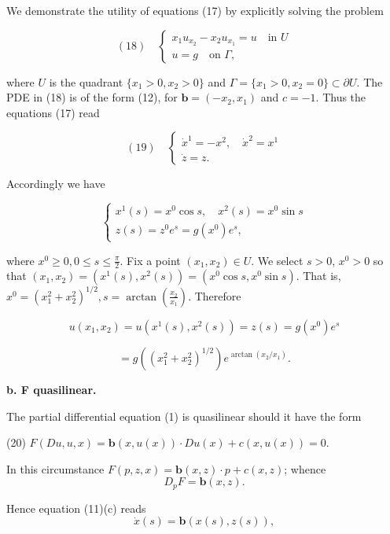 \begin{example}
\label{ex:linear-pde-quadrant-characteristics}
We demonstrate the utility of equations (17) by explicitly solving the problem

$$(18) \quad \left\{\begin{array}{l} x_1 u_{x_2} - x_2 u_{x_1} = u \quad \text{in } U \\ u = g \quad \text{on } \Gamma, \end{array}\right.$$

where $U$ is the quadrant $\{x_1 > 0, x_2 > 0\}$ and $\Gamma = \{x_1 > 0, x_2 = 0\} \subset \partial U$.
The PDE in (18) is of the form (12), for $\mathbf{b} = (-x_2, x_1)$ and $c = -1$. Thus the equations (17) read

$$(19) \quad \left\{\begin{array}{l} \dot{x}^1 = -x^2, \quad \dot{x}^2 = x^1 \\ \dot{z} = z. \end{array}\right.$$

Accordingly we have

$$\left\{\begin{array}{l} x^1(s) = x^0 \cos s, \quad x^2(s) = x^0 \sin s \\ z(s) = z^0 e^s = g(x^0) e^s, \end{array}\right.$$

where $x^0 \geq 0, 0 \leq s \leq \frac{\pi}{2}$. Fix a point $(x_1, x_2) \in U$. We select $s > 0$,
$x^0 > 0$ so that $(x_1, x_2) = (x^1(s), x^2(s)) = (x^0 \cos s, x^0 \sin s)$. That is, $x^0 =
(x_1^2 + x_2^2)^{1/2}, s = \arctan\left(\frac{x_2}{x_1}\right)$. Therefore

$$u(x_1, x_2) = u(x^1(s), x^2(s)) = z(s) = g(x^0) e^s$$

$$= g((x_1^2 + x_2^2)^{1/2}) e^{\arctan(x_2/x_1)}.$$
\end{example}

\textbf{b. F quasilinear.}

The partial differential equation (1) is quasilinear should it have the form

(20) \quad $F(Du, u, x) = \mathbf{b}(x, u(x)) \cdot Du(x) + c(x, u(x)) = 0$.

In this circumstance $F(p, z, x) = \mathbf{b}(x, z) \cdot p + c(x, z)$; whence
$$D_p F = \mathbf{b}(x, z).$$

Hence equation (11)(c) reads
$$\dot{x}(s) = \mathbf{b}(x(s), z(s)),$$

